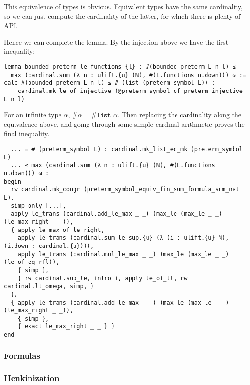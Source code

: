 \documentclass{article}
\newcommand{\al}{\alpha}
\newcommand{\<}{\langle}
\renewcommand{\>}{\rangle}
\theoremstyle{definitionstyle}
\theoremstyle{exercisestyle}
\theoremstyle{remarkstyle}
\begin{document}
This equivalence of types is obvious.
Equivalent types have the same cardinality, so
we can just compute the cardinality of the latter,
for which there is plenty of API.

Hence we can complete the lemma.
By the injection above we have the first inequality:
\begin{lstlisting}
lemma bounded_preterm_le_functions {l} : #(bounded_preterm L n l) ≤
  max (cardinal.sum (λ n : ulift.{u} (ℕ), #(L.functions n.down))) ω :=
calc #(bounded_preterm L n l) ≤ # (list (preterm_symbol L)) :
    cardinal.mk_le_of_injective (@preterm_symbol_of_preterm_injective L n l)
\end{lstlisting}
For an infinite type $\al$, $\# \al = \# \texttt{list } \al$.
Then replacing the cardinality along the equivalence above,
and going through some simple cardinal arithmetic proves the final inequality.
\begin{lstlisting}
  ... = # (preterm_symbol L) : cardinal.mk_list_eq_mk (preterm_symbol L)
  ... ≤ max (cardinal.sum (λ n : ulift.{u} (ℕ), #(L.functions n.down))) ω :
begin
  rw cardinal.mk_congr (preterm_symbol_equiv_fin_sum_formula_sum_nat L),
  simp only [...],
  apply le_trans (cardinal.add_le_max _ _) (max_le (max_le _ _) (le_max_right _ _)),
  { apply le_max_of_le_right,
    apply le_trans (cardinal.sum_le_sup.{u} (λ (i : ulift.{u} ℕ), (i.down : cardinal.{u}))),
    apply le_trans (cardinal.mul_le_max _ _) (max_le (max_le _ _) (le_of_eq rfl)),
    { simp },
    { rw cardinal.sup_le, intro i, apply le_of_lt, rw cardinal.lt_omega, simp, }
  },
  { apply le_trans (cardinal.add_le_max _ _) (max_le (max_le _ _) (le_max_right _ _)),
    { simp },
    { exact le_max_right _ _ } }
end \end{lstlisting}


\subsubsection{Formulas}

\subsubsection{Henkinization}

{}

\end{document}

